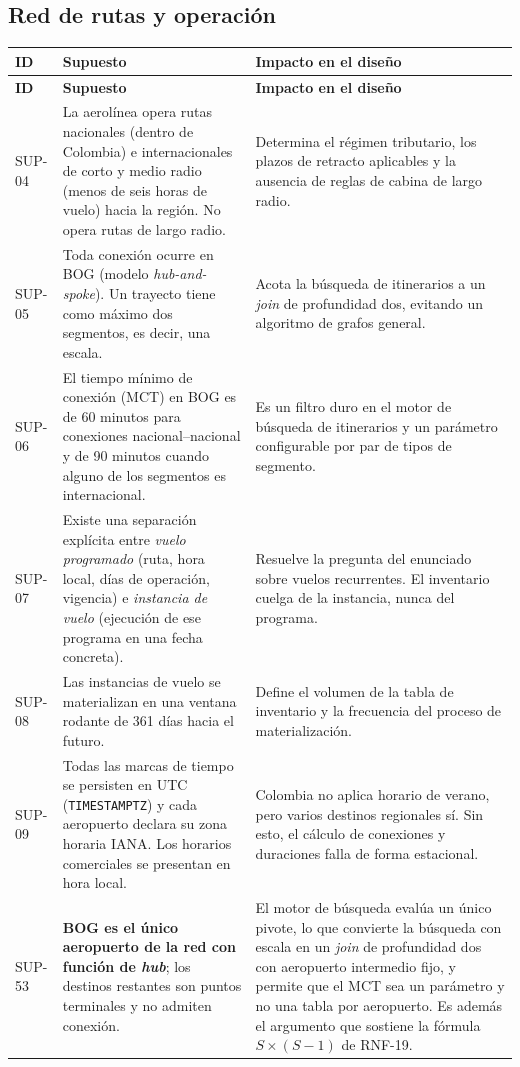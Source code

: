 \documentclass[10pt,letterpaper]{article}
\begin{document}
\subsection{Red de rutas y operación}
\begin{longtable}{@{}L{1.7cm} L{7.4cm} L{6.1cm}@{}}
\toprule
\textbf{ID} & \textbf{Supuesto} & \textbf{Impacto en el diseño} \\
\midrule
\endfirsthead
\toprule
\textbf{ID} & \textbf{Supuesto} & \textbf{Impacto en el diseño} \\
\midrule
\endhead
SUP-04 & La aerolínea opera rutas nacionales (dentro de Colombia) e internacionales de corto y medio radio (menos de seis horas de vuelo) hacia la región. No opera rutas de largo radio. & Determina el régimen tributario, los plazos de retracto aplicables y la ausencia de reglas de cabina de largo radio. \\
SUP-05 & Toda conexión ocurre en BOG (modelo \emph{hub-and-spoke}). Un trayecto tiene como máximo dos segmentos, es decir, una escala. & Acota la búsqueda de itinerarios a un \emph{join} de profundidad dos, evitando un algoritmo de grafos general. \\
SUP-06 & El tiempo mínimo de conexión (MCT) en BOG es de 60 minutos para conexiones nacional--nacional y de 90 minutos cuando alguno de los segmentos es internacional. & Es un filtro duro en el motor de búsqueda de itinerarios y un parámetro configurable por par de tipos de segmento. \\
SUP-07 & Existe una separación explícita entre \emph{vuelo programado} (ruta, hora local, días de operación, vigencia) e \emph{instancia de vuelo} (ejecución de ese programa en una fecha concreta). & Resuelve la pregunta del enunciado sobre vuelos recurrentes. El inventario cuelga de la instancia, nunca del programa. \\
SUP-08 & Las instancias de vuelo se materializan en una ventana rodante de 361 días hacia el futuro. & Define el volumen de la tabla de inventario y la frecuencia del proceso de materialización. \\
SUP-09 & Todas las marcas de tiempo se persisten en UTC (\texttt{TIMESTAMPTZ}) y cada aeropuerto declara su zona horaria IANA. Los horarios comerciales se presentan en hora local. & Colombia no aplica horario de verano, pero varios destinos regionales sí. Sin esto, el cálculo de conexiones y duraciones falla de forma estacional. \\
SUP-53 & \textbf{BOG es el único aeropuerto de la red con función de \emph{hub}}; los destinos restantes son puntos terminales y no admiten conexión. & El motor de búsqueda evalúa un único pivote, lo que convierte la búsqueda con escala en un \emph{join} de profundidad dos con aeropuerto intermedio fijo, y permite que el MCT sea un parámetro y no una tabla por aeropuerto. Es además el argumento que sostiene la fórmula $S \times (S-1)$ de RNF-19. \\

\end{longtable}
\end{document}
